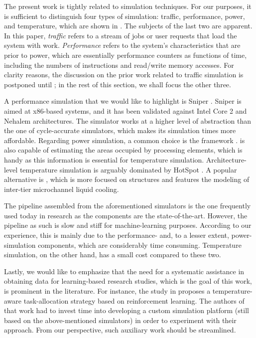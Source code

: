 The present work is tightly related to simulation techniques. For our purposes,
it is sufficient to distinguish four types of simulation: traffic, performance,
power, and temperature, which are shown in . The subjects of the
last two are apparent. In this paper, \emph{traffic} refers to a stream of jobs
or user requests that load the system with work. \emph{Performance} refers to
the system's characteristics that are prior to power, which are essentially
performance counters as functions of time, including the numbers of instructions
and read/write memory accesses. For clarity reasons, the discussion on the prior
work related to traffic simulation is postponed until ; in the
rest of this section, we shall focus the other three.

A performance simulation that we would like to highlight is Sniper
\cite{carlson2011}. Sniper is aimed at x86-based systems, and it has been
validated against Intel Core 2 and Nehalem architectures. The simulator works at
a higher level of abstraction than the one of cycle-accurate simulators, which
makes its simulation times more affordable. Regarding power simulation, a common
choice is the  framework \cite{li2009}.  is also capable of
estimating the areas occupied by processing elements, which is handy as this
information is essential for temperature simulation. Architecture-level
temperature simulation is arguably dominated by HotSpot \cite{skadron2004}. A
popular alternative is  \cite{sridhar2010}, which is more focused on
 structures and features the modeling of inter-tier microchannel liquid
cooling.

The pipeline assembled from the aforementioned simulators is the one frequently
used today in research as the components are the state-of-the-art. However, the
pipeline as such is slow and stiff for machine-learning purposes. According to
our experience, this is mainly due to the performance- and, to a lesser extent,
power-simulation components, which are considerably time consuming. Temperature
simulation, on the other hand, has a small cost compared to these two.

Lastly, we would like to emphasize that the need for a systematic assistance in
obtaining data for learning-based research studies, which is the goal of this
work, is prominent in the literature. For instance, the study in \cite{lu2015}
proposes a temperature-aware task-allocation strategy based on reinforcement
learning. The authors of that work had to invest time into developing a custom
simulation platform (still based on the above-mentioned simulators) in order to
experiment with their approach. From our perspective, such auxiliary work should
be streamlined.

